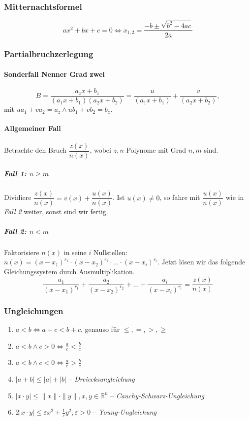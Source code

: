 \documentclass[a4paper, 9pt, DIV=24]{scrartcl}
\begin{document}
\subsubsection{Mitternachtsformel}
\[ ax^2 + bx + c = 0 \iff x_{1,2} = \frac{-b \pm \sqrt{b^2 - 4ac}}{2a} \]

\subsubsection{Partialbruchzerlegung}
\paragraph{Sonderfall Nenner Grad zwei}
\[
 B = \dfrac{a_zx+b_z}{(a_1x+b_1)(a_2x+b_2)} = \dfrac{u}{(a_1x+b_1)} + \dfrac{v}{(a_2x+b_2)},
\]
mit $ua_1 + va_2 = a_z \wedge ub_1 + vb_2 = b_z$.
\paragraph{Allgemeiner Fall}
Betrachte den Bruch $\dfrac{z(x)}{n(x)}$, wobei $z,n$ Polynome mit Grad $n,m$ sind.
\subparagraph{Fall 1: $n \geq m$}
Dividiere $\dfrac{z(x)}{n(x)} = v(x) + \dfrac{u(x)}{n(x)}$.
Ist $u(x) \neq 0$, so fahre mit $\dfrac{u(x)}{n(x)}$ wie in \emph{Fall 2} weiter, sonst sind wir fertig.
\subparagraph{Fall 2: $n < m$}
Faktorisiere $n(x)$ in seine $i$ Nullstellen: $n(x) = (x-x_1)^{r_1} \cdot (x-x_2)^{r_2} \cdot \dots \cdot (x-x_i)^{r_i}.$
Jetzt lösen wir das folgende Gleichungssystem durch Ausmultiplikation.
\[ \frac{a_1}{(x-x_1)^{r_1}} + \frac{a_2}{(x-x_2)^{r_2}} + \dots + \frac{a_i}{(x-x_i)^{r_i}} = \frac{z(x)}{n(x)} \]

\subsubsection{Ungleichungen}
\begin{enumerate}[label={(}\arabic*{)}]
 \item $a < b \iff a + c < b + c$, genauso für $\leq,=,>,\geq$
 \item $a < b \wedge c > 0 \iff \frac{a}{c} < \frac{b}{c}$
 \item $a < b \wedge c < 0 \iff \frac{a}{c} > \frac{b}{c}$
 \item $|a+b| \leq |a| + |b|$ -- \emph{Dreiecksungleichung}
 \item $|x\cdot y| \leq \|x\|\cdot\|y\|, x,y \in \mathbb{R}^n$ -- \emph{Cauchy-Schwarz-Ungleichung}
 \item $2|x\cdot y| \leq \varepsilon x^2 + \frac{1}{\varepsilon}y^2, \varepsilon > 0$ -- \emph{Young-Ungleichung}
\end{enumerate}
\end{document}
